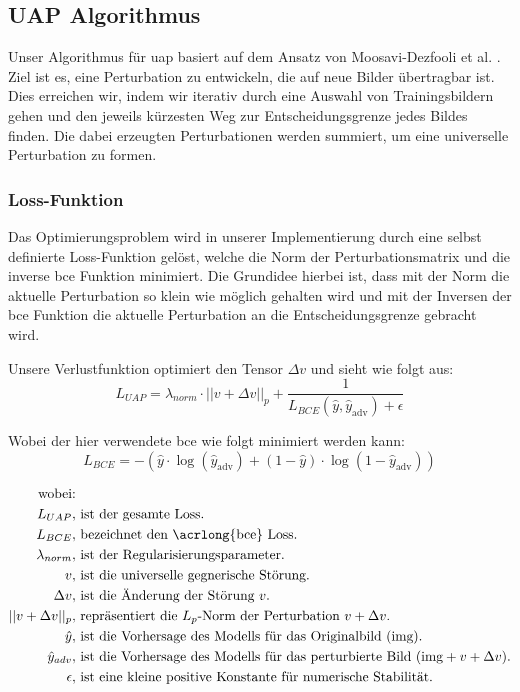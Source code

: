 \subsection{UAP Algorithmus}

Unser Algorithmus für \acrfull{uap} basiert auf dem Ansatz von Moosavi-Dezfooli et al. \cite{moosavi-dezfooli_universal_2017}. Ziel ist es, eine Perturbation zu entwickeln, die auf neue Bilder übertragbar ist. Dies erreichen wir, indem wir iterativ durch eine Auswahl von Trainingsbildern gehen und den jeweils kürzesten Weg zur Entscheidungsgrenze jedes Bildes finden. Die dabei erzeugten Perturbationen werden summiert, um eine universelle Perturbation zu formen. 

\subsubsection{Loss-Funktion}
Das Optimierungsproblem wird in unserer Implementierung durch eine selbst definierte Loss-Funktion gelöst, welche die Norm der Perturbationsmatrix und die inverse \acrlong{bce} Funktion minimiert. Die Grundidee hierbei ist, dass mit der Norm die aktuelle Perturbation so klein wie möglich gehalten wird und mit der Inversen der \acrlong{bce} Funktion die aktuelle Perturbation an die Entscheidungsgrenze gebracht wird. 

Unsere Verlustfunktion optimiert den Tensor $\Delta v$ und sieht wie folgt aus:
\begin{equation}
    L_{UAP} = \lambda_{norm} \cdot ||v + \Delta v||_p + \frac{1}{L_{BCE}(\hat{y}, \hat{y}_{\text{adv}}) + \epsilon}
\label{Loss}
\end{equation}

Wobei der hier verwendete \acrlong{bce} wie folgt minimiert werden kann:
\begin{equation}
L_{BCE} = - (\hat{y} \cdot \log(\hat{y}_{\text{adv}}) + (1-\hat{y}) \cdot \log(1-\hat{y}_{\text{adv}}))
\label{eq:BCE}
\end{equation}

\begin{align*}
\text{wobei:}&\\
L_{UAP}, &\text{ ist der gesamte Loss.} \\
L_{BCE}, &\text{ bezeichnet den \acrlong{bce} Loss.} \\
\lambda_{norm}, &\text{ ist der Regularisierungsparameter.} \\
v, &\text{ ist die universelle gegnerische Störung.} \\
\Delta v, &\text{ ist die Änderung der Störung } v \text{.} \\
||v + \Delta v||_p, &\text{ repräsentiert die } L_p \text{-Norm der Perturbation } v + \Delta v. \\
\hat{y}, &\text{ ist die Vorhersage des Modells für das Originalbild ($\text{img}$).} \\
\hat{y}_{adv}, &\text{ ist die Vorhersage des Modells für das perturbierte Bild ($\text{img} + v + \Delta v$).} \\
\epsilon, &\text{ ist eine kleine positive Konstante für numerische Stabilität.}
\end{align*}


